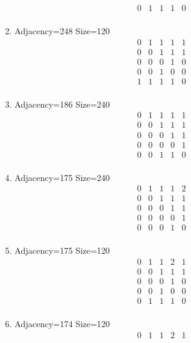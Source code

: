 \documentclass[12pt]{article}
\begin{document}
\begin{multicols}{3}
\begin{enumerate}
\begin{equation*}
\begin{array}{ccccc}
0&1&1&1&0\\
\end{array}
\end{equation*}
\item Adjacency=248 Size=120
\begin{equation*}
\begin{array}{ccccc}
0&1&1&1&1\\
0&0&1&1&1\\
0&0&0&1&0\\
0&0&1&0&0\\
1&1&1&1&0\\
\end{array}
\end{equation*}
\item Adjacency=186 Size=240
\begin{equation*}
\begin{array}{ccccc}
0&1&1&1&1\\
0&0&1&1&1\\
0&0&0&1&1\\
0&0&0&0&1\\
0&0&1&1&0\\
\end{array}
\end{equation*}
\item Adjacency=175 Size=240
\begin{equation*}
\begin{array}{ccccc}
0&1&1&1&2\\
0&0&1&1&1\\
0&0&0&1&1\\
0&0&0&0&1\\
0&0&0&1&0\\
\end{array}
\end{equation*}
\item Adjacency=175 Size=120
\begin{equation*}
\begin{array}{ccccc}
0&1&1&2&1\\
0&0&1&1&1\\
0&0&0&1&0\\
0&0&1&0&0\\
0&1&1&1&0\\
\end{array}
\end{equation*}
\item Adjacency=174 Size=120
\begin{equation*}
\begin{array}{ccccc}
0&1&1&2&1\\

\end{array}
\end{equation*}
\end{enumerate}
\end{multicols}
\end{document}
